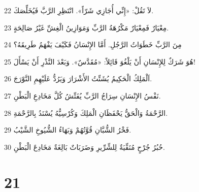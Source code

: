 \par 22 لاَ تَقُلْ: «إِنِّي أُجَازِي شَرّاً». انْتَظِرِ الرَّبَّ فَيُخَلِّصَكَ.
\par 23 مِعْيَارٌ فَمِعْيَارٌ مَكْرُهَةُ الرَّبِّ وَمَوَازِينُ الْغِشِّ غَيْرُ صَالِحَةٍ.
\par 24 مِنَ الرَّبِّ خَطَوَاتُ الرَّجُلِ. أَمَّا الإِنْسَانُ فَكَيْفَ يَفْهَمُ طَرِيقَهُ؟
\par 25 هُوَ شَرَكٌ لِلإِنْسَانِ أَنْ يَلْغُوَ قَائِلاً: «مُقَدَّسٌ». وَبَعْدَ النَّذْرِ أَنْ يَسْأَلَ!
\par 26 اَلْمَلِكُ الْحَكِيمُ يُشَتِّتُ الأَشْرَارَ وَيَرُدُّ عَلَيْهِمِ النَّوْرَجَ.
\par 27 نَفْسُ الإِنْسَانِ سِرَاجُ الرَّبِّ يُفَتِّشُ كُلَّ مَخَادِعِ الْبَطْنِ.
\par 28 الرَّحْمَةُ وَالْحَقُّ يَحْفَظَانِ الْمَلِكَ وَكُرْسِيُّهُ يُسْنَدُ بِالرَّحْمَةِ.
\par 29 فَخْرُ الشُّبَّانِ قُوَّتُهُمْ وَبَهَاءُ الشُّيُوخِ الشَّيْبُ.
\par 30 حُبُرُ جُرْحٍ مُنَقِّيَةٌ لِلشِّرِّيرِ وَضَرَبَاتٌ بَالِغَةٌ مَخَادِعَ الْبَطْنِ.

\chapter{21}

